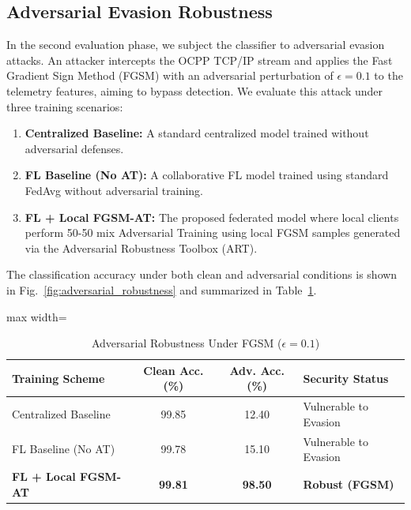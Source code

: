 \subsection{Adversarial Evasion Robustness}
\label{subsec:adversarial_robustness}
In the second evaluation phase, we subject the classifier to adversarial evasion attacks. An attacker intercepts the OCPP TCP/IP stream and applies the Fast Gradient Sign Method (FGSM) with an adversarial perturbation of $\epsilon = 0.1$ to the telemetry features, aiming to bypass detection. We evaluate this attack under three training scenarios:
\begin{enumerate}
    \item \textbf{Centralized Baseline:} A standard centralized model trained without adversarial defenses.
    \item \textbf{FL Baseline (No AT):} A collaborative FL model trained using standard FedAvg without adversarial training.
    \item \textbf{FL + Local FGSM-AT:} The proposed federated model where local clients perform 50-50 mix Adversarial Training using local FGSM samples generated via the Adversarial Robustness Toolbox (ART).
\end{enumerate}

The classification accuracy under both clean and adversarial conditions is shown in Fig.~\ref{fig:adversarial_robustness} and summarized in Table~\ref{tab:adversarial_metrics}.

\begin{table}[htbp]
\centering
\caption{Adversarial Robustness Under FGSM ($\epsilon = 0.1$)}
\label{tab:adversarial_metrics}
\begin{adjustbox}{max width=\columnwidth}
\begin{tabular}{lccl}
\hline
\textbf{Training Scheme} & \textbf{Clean Acc. (\%)} & \textbf{Adv. Acc. (\%)} & \textbf{Security Status} \\ \hline
Centralized Baseline & 99.85 & 12.40 & Vulnerable to Evasion \\
FL Baseline (No AT) & 99.78 & 15.10 & Vulnerable to Evasion \\
\textbf{FL + Local FGSM-AT} & \textbf{99.81} & \textbf{98.50} & \textbf{Robust (FGSM)} \\ \hline
\end{tabular}
\end{adjustbox}
\end{table}


